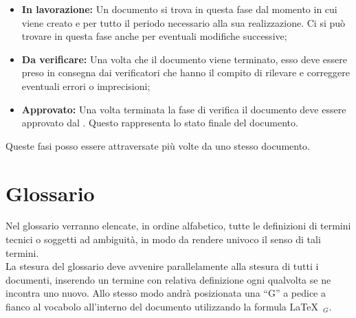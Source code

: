 \begin{itemize}
\item \textbf{In lavorazione:} Un documento si trova in questa fase dal momento in cui viene creato e per tutto il periodo necessario alla sua realizzazione. Ci si può trovare in questa fase anche per eventuali modifiche successive;
\item \textbf{Da verificare:} Una volta che il documento viene terminato, esso deve essere preso in consegna dai verificatori che hanno il compito di rilevare e correggere eventuali errori o imprecisioni;
\item \textbf{Approvato:} Una volta terminata la fase di verifica il documento deve essere approvato dal \ruoloResponsabile. Questo rappresenta lo stato finale del documento. 
\end{itemize}
Queste fasi posso essere attraversate più volte da uno stesso documento.

\section{Glossario}
Nel glossario verranno elencate, in ordine alfabetico, tutte le definizioni di termini tecnici o soggetti ad ambiguità, in modo da rendere univoco il senso di tali termini. \\
La stesura del glossario deve avvenire parallelamente alla stesura di tutti i documenti, inserendo un termine con relativa definizione ogni qualvolta se ne incontra uno nuovo. Allo stesso modo andrà posizionata una ``G'' a pedice a fianco al vocabolo all'interno del documento utilizzando la formula \LaTeX\ $_G$.



